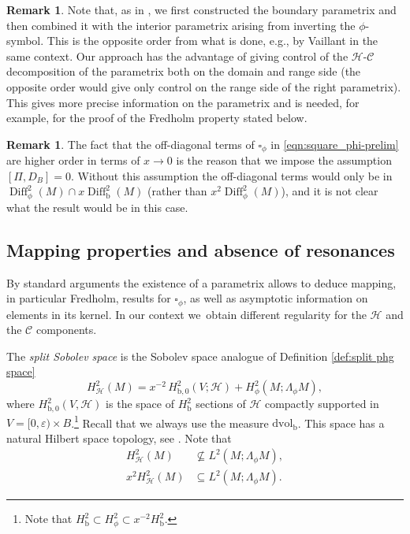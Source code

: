 \documentclass[11pt]{article}
\numberwithin{equation}{section}
\theoremstyle{plain}
\theoremstyle{definition}
\newtheorem{Rem}[Th]{Remark}
\newcommand{\bb}{{\mathrm{b}}}
\newcommand{\dvol}{\mathrm{dvol}}
\DeclareMathOperator{\Diff}{Diff}
\newcommand{\Hsplit}{H_{\mathscr{H}}}
\begin{document}
\begin{Rem}
Note that, as in \cite{grieser-para}, we first constructed the boundary parametrix and then combined it with the interior parametrix arising from inverting the $\phi$-symbol. This is the opposite order from what is done, e.g., by
Vaillant \cite{vaillant} in the same context. Our approach has the advantage of giving control of the $\mathscr{H}$-$\mathscr{C}$ decomposition of the parametrix both on the domain and range side (the opposite order would give only control on the range side of the right parametrix). This gives more precise information on the parametrix and is needed, for example, for the proof of the Fredholm property stated below.
\end{Rem}
\begin{Rem}\label{Dpi-condition}
The fact that the off-diagonal terms of $\square_\phi$ in \eqref{eqn:square_phi-prelim} are higher order in terms of $x\to0$ is the reason that we impose the assumption $[\Pi,D_B]=0$. Without this assumption the off-diagonal terms would only be in $\Diff^2_\phi(M)\cap x\Diff^2_\bb(M)$ (rather than $x^2\Diff^2_\phi(M)$), and it is not clear what the result would be in this case.
\end{Rem}

\subsection{Mapping properties and absence of resonances}
By standard arguments the existence of a parametrix allows to deduce mapping, in particular Fredholm, results for $\square_\phi$, as well as asymptotic information on elements in its kernel. In our context we~obtain different regularity for the $\mathscr{H}$ and the $\mathscr{C}$ components.

The \emph{split Sobolev space} is the Sobolev space analogue of Definition \ref{def:split phg space}
\begin{equation}
\label{eqn:def Hsplit}
\Hsplit^2(M) = x^{-2}\,H^2_{\bb,0}(V;\mathscr{H}) + H^2_\phi(M; \Lambda_\phi M),
\end{equation}
where $H^2_{\bb,0}(V,\mathscr{H})$ is the space of $H^2_\bb$ sections of
$\mathscr{H}$ compactly supported in $V=[0,\varepsilon) \times B$.\footnote{Note that $H^2_\bb\subset H^2_\phi\subset x^{-2}H^2_\bb$.}
Recall that we always use the measure $\dvol_\bb$.
This space has a natural Hilbert space topology, see
\cite[\S 6.1, Def.\,7]{grieser-para}. Note that
\begin{equation}\label{H-split-inclusions}
\begin{split}
H^2_{\mathscr{H}}(M) &\not\subseteq
L^2(M; \Lambda_\phi M), \\
x^2H^2_{\mathscr{H}}(M) &\subseteq
L^2(M; \Lambda_\phi M).
\end{split}
\end{equation}
\end{document}
